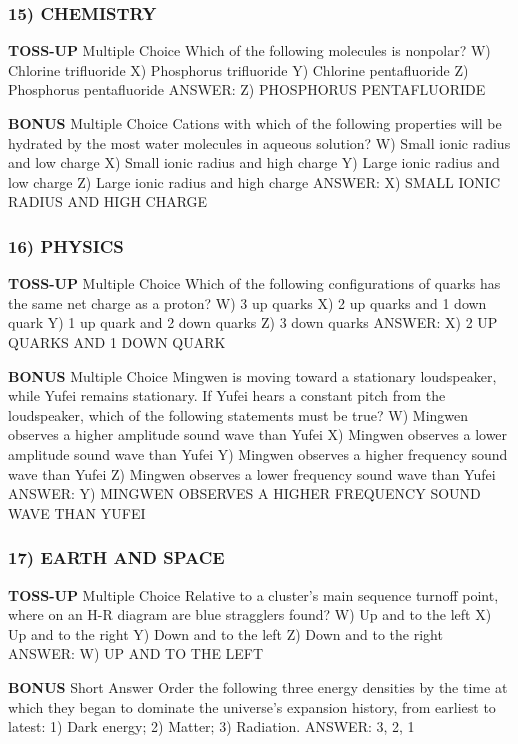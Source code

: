 \documentclass{article}
\begin{document}
\subsubsection*{15) CHEMISTRY}
\textbf{TOSS-UP}
Multiple Choice Which of the following molecules is nonpolar?
W) Chlorine trifluoride
X) Phosphorus trifluoride
Y) Chlorine pentafluoride
Z) Phosphorus pentafluoride
ANSWER: Z) PHOSPHORUS PENTAFLUORIDE

\textbf{BONUS}
Multiple Choice Cations with which of the following properties will be hydrated by the most water molecules in aqueous solution?
W) Small ionic radius and low charge
X) Small ionic radius and high charge
Y) Large ionic radius and low charge
Z) Large ionic radius and high charge
ANSWER: X) SMALL IONIC RADIUS AND HIGH CHARGE

\subsubsection*{16) PHYSICS}
\textbf{TOSS-UP}
Multiple Choice Which of the following configurations of quarks has the same net charge as a proton?
W) 3 up quarks
X) 2 up quarks and 1 down quark
Y) 1 up quark and 2 down quarks
Z) 3 down quarks
ANSWER: X) 2 UP QUARKS AND 1 DOWN QUARK

\textbf{BONUS}
Multiple Choice Mingwen is moving toward a stationary loudspeaker, while Yufei remains stationary. If Yufei hears a constant pitch from the loudspeaker, which of the following statements must be true?
W) Mingwen observes a higher amplitude sound wave than Yufei
X) Mingwen observes a lower amplitude sound wave than Yufei
Y) Mingwen observes a higher frequency sound wave than Yufei
Z) Mingwen observes a lower frequency sound wave than Yufei
ANSWER: Y) MINGWEN OBSERVES A HIGHER FREQUENCY SOUND WAVE THAN YUFEI

\subsubsection*{17) EARTH AND SPACE}
\textbf{TOSS-UP}
Multiple Choice Relative to a cluster's main sequence turnoff point, where on an H-R diagram are blue stragglers found?
W) Up and to the left
X) Up and to the right
Y) Down and to the left
Z) Down and to the right
ANSWER: W) UP AND TO THE LEFT

\textbf{BONUS}
Short Answer Order the following three energy densities by the time at which they began to dominate the universe's expansion history, from earliest to latest: 1) Dark energy; 2) Matter; 3) Radiation.
ANSWER: 3, 2, 1
\end{document}
